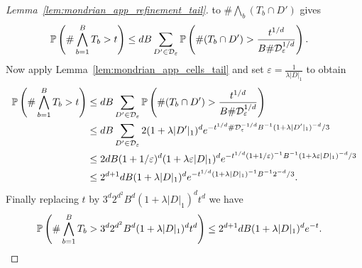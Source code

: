 \begin{proof}[Lemma~\ref{lem:mondrian_app_refinement_tail}]
  to $\# \bigwedge_b (T_b \cap D')$ gives
  \begin{align*}
    \P\left(
      \# \bigwedge_{b=1}^B T_b
      > t
    \right)
    &\leq
    d B \sum_{D' \in \cD_\varepsilon}
    \P\left(
      \# (T_b \cap D')
      > \frac{t^{1/d}}{B \# \cD_\varepsilon^{1/d}}
    \right).
  \end{align*}
  Now apply Lemma~\ref{lem:mondrian_app_cells_tail}
  and set $\varepsilon = \frac{1}{\lambda |D|_1}$ to obtain
  \begin{align*}
    \P\left(
      \# \bigwedge_{b=1}^B T_b
      > t
    \right)
    &\leq
    d B \sum_{D' \in \cD_\varepsilon}
    \P\left(
      \# (T_b \cap D')
      > \frac{t^{1/d}}{B \# \cD_\varepsilon^{1/d}}
    \right) \\
    &\leq
    d B \sum_{D' \in \cD_\varepsilon}
    2 (1 + \lambda |D'|_1)^d
    e^{- t^{1/d} \# \cD_\varepsilon^{-1/d} B^{-1}
    (1 + \lambda |D'|_1)^{-d} / 3} \\
    &\leq
    2 d B (1 + 1 / \varepsilon)^d
    (1 + \lambda \varepsilon |D|_1)^d
    e^{- t^{1/d} (1 + 1/\varepsilon)^{-1} B^{-1}
    (1 + \lambda \varepsilon |D|_1)^{-d} / 3} \\
    &\leq
    2^{d+1} d B (1 + \lambda |D|_1)^d
    e^{- t^{1/d} (1 + \lambda |D|_1)^{-1} B^{-1} 2^{-d} / 3}.
  \end{align*}
  Finally replacing $t$ by $3^d 2^{d^2} B^d (1+\lambda|D|_1)^d t^d$ we have
  \begin{align*}
    \P\left(
      \# \bigwedge_{b=1}^B T_b
      > 3^d 2^{d^2} B^d (1+\lambda|D|_1)^d t^d
    \right)
    &\leq
    2^{d+1} d B (1 + \lambda |D|_1)^d e^{-t}.
  \end{align*}
\end{proof}
